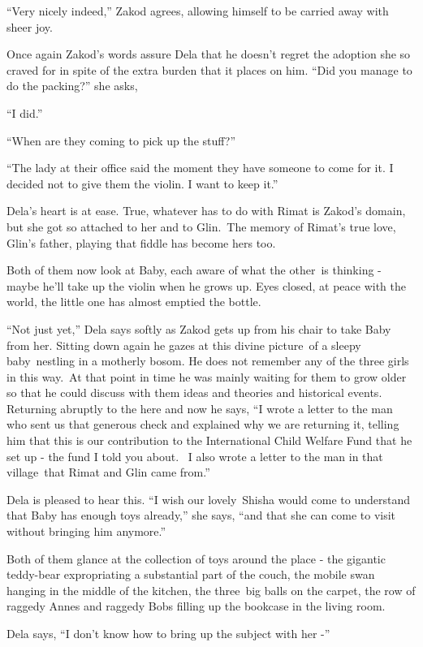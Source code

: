 \documentclass[twoside,11pt]{book}
\begin{document}
``Very nicely indeed,'' Zakod agrees, allowing himself to be carried away with sheer joy.

Once again Zakod's words assure Dela that he doesn't regret the adoption she so craved for in spite of the extra burden
that it places on him. ``Did you manage to do the packing?'' she asks,

``I did.'' 

``When are they coming to pick up the stuff?'' 

``The lady at their office said the moment they have someone to come for it. I decided not to give them the
violin. I want to keep it.''

Dela{}'s heart is at ease. True, whatever has to do with Rimat is Zakod's domain, but she got so attached to her and to
Glin.\ The memory of Rimat's true love, Glin's father, playing that fiddle has become hers too. 

Both of them now look at Baby, each aware of what the other~is thinking - maybe he'll take up the violin when he grows
up. Eyes closed, at peace with the world, the little one has almost emptied the bottle.\ 

``Not just yet,'' Dela says softly as Zakod gets up from his chair to take Baby from her.
Sitting down again he gazes at this divine picture~of a sleepy baby~nestling in a motherly bosom. He does not remember
any of the three girls in this way.\ At that point in time he was mainly waiting for them to grow older so that he
could discuss with them ideas and theories and historical events. Returning abruptly to the here and now he says,
``I wrote a letter to the man who sent us that generous check and explained why we are returning it,
telling him that this is our contribution to the International Child Welfare Fund that he set up - the fund I told you
about. ~I also wrote a letter to the man in that village\ that Rimat and Glin came from.'' 

Dela is pleased to hear this. ``I wish our lovely~Shisha would come to understand that Baby has enough toys
already,'' she says, ``and that she can come to visit without bringing him anymore.''

Both of them glance at the collection of toys around the place - the gigantic teddy-bear expropriating a substantial
part of the couch, the mobile swan hanging in the middle of the kitchen, the three~big balls on the carpet, the row of
raggedy Annes and raggedy Bobs filling up the bookcase in the living room. 

Dela says, ``I don't know how to bring up the subject with her -'' 
\end{document}
